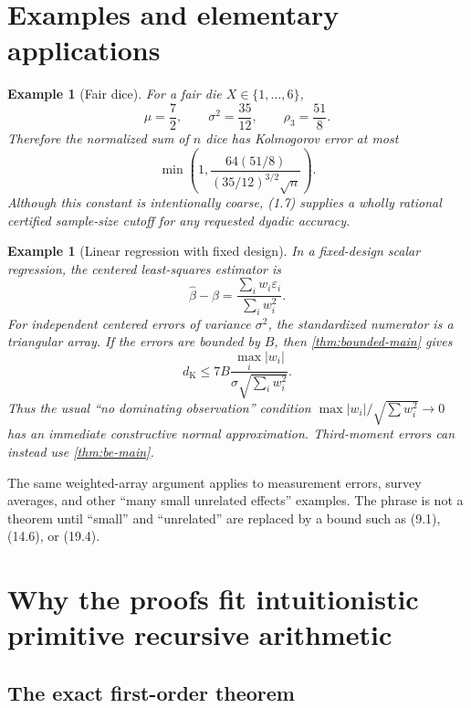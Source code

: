 \documentclass[11pt]{article}
\newtheorem{example}[theorem]{Example}
\newcommand{\dk}{d_{\mathrm K}}
\begin{document}
\section{Examples and elementary applications}
\label{sec:applications}

\begin{example}[Fair dice]
For a fair die \(X\in\{1,\ldots,6\}\),
\[
 \mu=\frac72,
 \qquad \sigma^2=\frac{35}{12},
 \qquad \rho_3=\frac{51}{8}.                         \tag{19.1}
\]
Therefore the normalized sum of \(n\) dice has Kolmogorov error at most
\[
 \min\!\left(1,
 \frac{64(51/8)}{(35/12)^{3/2}\sqrt n}\right).       \tag{19.2}
\]
Although this constant is intentionally coarse, (1.7) supplies a wholly
rational certified sample-size cutoff for any requested dyadic accuracy.
\end{example}

\begin{example}[Linear regression with fixed design]
In a fixed-design scalar regression, the centered least-squares estimator is
\[
 \widehat\beta-\beta
 =\frac{\sum_i w_i\varepsilon_i}{\sum_i w_i^2}.       \tag{19.3}
\]
For independent centered errors of variance \(\sigma^2\), the standardized
numerator is a triangular array.  If the errors are bounded by \(B\), then
\cref{thm:bounded-main} gives
\[
 \dk\le
 7B\frac{\max_i|w_i|}{\sigma\sqrt{\sum_iw_i^2}}.     \tag{19.4}
\]
Thus the usual ``no dominating observation'' condition
\(\max|w_i|/\sqrt{\sum w_i^2}\to0\) has an immediate constructive normal
approximation.  Third-moment errors can instead use \cref{thm:be-main}.
\end{example}

The same weighted-array argument applies to measurement errors, survey
averages, and other ``many small unrelated effects'' examples.  The phrase is
not a theorem until ``small'' and ``unrelated'' are replaced by a bound such
as (9.1), (14.6), or (19.4).

\section{Why the proofs fit intuitionistic primitive recursive arithmetic}
\label{sec:ipra-audit}

\subsection{The exact first-order theorem}
\end{document}
